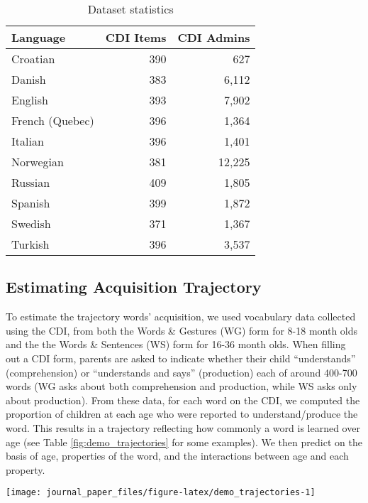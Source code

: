 \documentclass[9pt,twocolumn,twoside]{pnas-new}
\begin{document}
\begin{table}[ht]
\centering
\begin{tabular}{lrr}
  \hline
Language & CDI Items & CDI Admins \\ 
  \hline
Croatian & 390 & 627 \\ 
  Danish & 383 & 6,112 \\ 
  English & 393 & 7,902 \\ 
  French (Quebec) & 396 & 1,364 \\ 
  Italian & 396 & 1,401 \\ 
  Norwegian & 381 & 12,225 \\ 
  Russian & 409 & 1,805 \\ 
  Spanish & 399 & 1,872 \\ 
  Swedish & 371 & 1,367 \\ 
  Turkish & 396 & 3,537 \\ 
   \hline
\end{tabular}
\caption{Dataset statistics} 
\label{table:lang_stats}
\end{table}

\subsection{Estimating Acquisition
Trajectory}\label{estimating-acquisition-trajectory}

To estimate the trajectory words' acquisition, we used vocabulary data
collected using the CDI, from both the Words \& Gestures (WG) form for
8-18 month olds and the the Words \& Sentences (WS) form for 16-36 month
olds. When filling out a CDI form, parents are asked to indicate whether
their child ``understands'' (comprehension) or ``understands and says''
(production) each of around 400-700 words (WG asks about both
comprehension and production, while WS asks only about production). From
these data, for each word on the CDI, we computed the proportion of
children at each age who were reported to understand/produce the word.
This results in a trajectory reflecting how commonly a word is learned
over age (see Table \ref{fig:demo_trajectories} for some examples). We
then predict on the basis of age, properties of the word, and the
interactions between age and each property.

\begin{figure*}

{\centering \texttt{[image: journal\_paper\_files/figure-latex/demo\_trajectories-1]} 

}

\caption{Example trajectories for the words "dog" and "jump" across language.}\label{fig:demo_trajectories}
\end{figure*}
\end{document}

